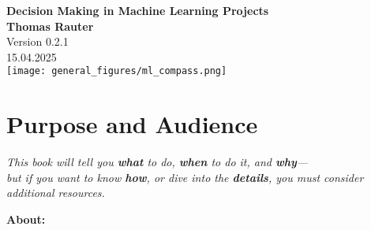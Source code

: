 \documentclass[12pt,openany]{book}
\begin{document}
\begin{titlepage}
    \centering
    \newpage
    \thispagestyle{empty}
    
    
    \vspace*{2cm}
    {\LARGE \textbf{\textcolor{darknavy}{Decision Making in Machine Learning Projects}}} \\

    
    \vspace{2cm}  %
    \Large{\textcolor{darknavy}{\textbf{Thomas Rauter}}} \\
    
    \vspace{0.5cm}
    \large{\textcolor{darknavy}{Version 0.2.1}} \\
    \large{\textcolor{darknavy}{15.04.2025}} \\
    
    \vspace{1.5cm}
    \texttt{[image: general\_figures/ml\_compass.png]} \\
    
\end{titlepage}


\setcounter{tocdepth}{1}

\tableofcontents

\newpage

\section{Purpose and Audience}

\begin{center}
\textit{This book will tell you \textcolor{green!50!black}{\textbf{what}} to do, \textcolor{green!50!black}{\textbf{when}} to do it, and \textcolor{green!50!black}{\textbf{why}}—\\
but if you want to know \textcolor{red!70!black}{\textbf{how}}, or dive into the \textcolor{red!70!black}{\textbf{details}}, you must consider additional resources.}
\end{center}

\vspace{1em}
\textbf{About:}
\end{document}
